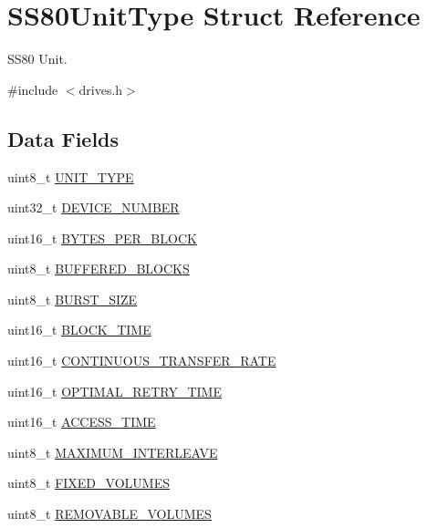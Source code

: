 \hypertarget{structSS80UnitType}{}\section{S\+S80\+Unit\+Type Struct Reference}
\label{structSS80UnitType}


S\+S80 Unit.  




{\ttfamily \#include $<$drives.\+h$>$}

\subsection*{Data Fields}
\begin{DoxyCompactItemize}
\item 
uint8\+\_\+t \hyperlink{structSS80UnitType_ae00e42430682e849d83b1ca4c8f44013}{U\+N\+I\+T\+\_\+\+T\+Y\+PE}
\item 
uint32\+\_\+t \hyperlink{structSS80UnitType_a69cad18aab93449fbd91445c4ba62928}{D\+E\+V\+I\+C\+E\+\_\+\+N\+U\+M\+B\+ER}
\item 
uint16\+\_\+t \hyperlink{structSS80UnitType_a18a5f03be6bea14c6c4a1f9b952bb160}{B\+Y\+T\+E\+S\+\_\+\+P\+E\+R\+\_\+\+B\+L\+O\+CK}
\item 
uint8\+\_\+t \hyperlink{structSS80UnitType_a575a381fe873ba8ba9aa4630673516a4}{B\+U\+F\+F\+E\+R\+E\+D\+\_\+\+B\+L\+O\+C\+KS}
\item 
uint8\+\_\+t \hyperlink{structSS80UnitType_a4bc66bc02c06dbfe279be6d2af808a04}{B\+U\+R\+S\+T\+\_\+\+S\+I\+ZE}
\item 
uint16\+\_\+t \hyperlink{structSS80UnitType_ab94c4b75c74e08e128d4802f5dec0dd5}{B\+L\+O\+C\+K\+\_\+\+T\+I\+ME}
\item 
uint16\+\_\+t \hyperlink{structSS80UnitType_a366858b222baf5ef0a864ea505d3fd82}{C\+O\+N\+T\+I\+N\+U\+O\+U\+S\+\_\+\+T\+R\+A\+N\+S\+F\+E\+R\+\_\+\+R\+A\+TE}
\item 
uint16\+\_\+t \hyperlink{structSS80UnitType_ab7ae848f0a65aa2e29b613bc110c9085}{O\+P\+T\+I\+M\+A\+L\+\_\+\+R\+E\+T\+R\+Y\+\_\+\+T\+I\+ME}
\item 
uint16\+\_\+t \hyperlink{structSS80UnitType_ab43ef110f145d428fff831afc18f5e24}{A\+C\+C\+E\+S\+S\+\_\+\+T\+I\+ME}
\item 
uint8\+\_\+t \hyperlink{structSS80UnitType_ab215c7a9a84d0d5003a2dcfbd18e4b7d}{M\+A\+X\+I\+M\+U\+M\+\_\+\+I\+N\+T\+E\+R\+L\+E\+A\+VE}
\item 
uint8\+\_\+t \hyperlink{structSS80UnitType_ae1d52bfc5a9bdb8f6f26ba6dffd7c2f6}{F\+I\+X\+E\+D\+\_\+\+V\+O\+L\+U\+M\+ES}
\item 
uint8\+\_\+t \hyperlink{structSS80UnitType_a6dcef2939bd0a19951ad1592b1ec8c31}{R\+E\+M\+O\+V\+A\+B\+L\+E\+\_\+\+V\+O\+L\+U\+M\+ES}
\end{DoxyCompactItemize}


